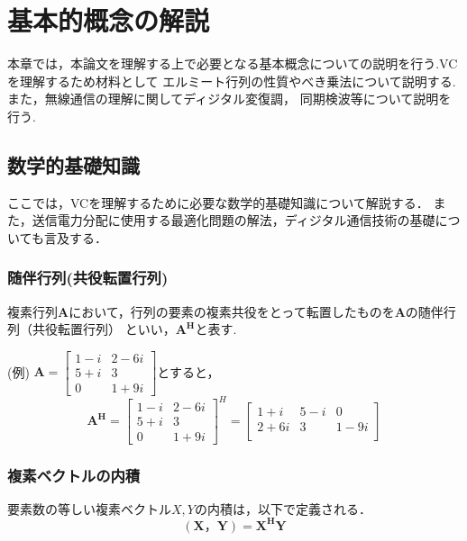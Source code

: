 \chapter{基本的概念の解説}
本章では，本論文を理解する上で必要となる基本概念についての説明を行う.VCを理解するため材料として
エルミート行列の性質やべき乗法について説明する. \cite{strang} また，無線通信の理解に関してディジタル変復調，
同期検波等について説明を行う.

\section{数学的基礎知識}
ここでは，VCを理解するために必要な数学的基礎知識について解説する．
また，送信電力分配に使用する最適化問題の解法，ディジタル通信技術の基礎についても言及する．

\subsection{随伴行列(共役転置行列)}
複素行列$\bm{A}$において，行列の要素の複素共役をとって転置したものを$\bm{A}$の随伴行列（共役転置行列）
といい，$\bm{A^H}$と表す.

(例)\quad
$
  \bm{A} = \left[
    \begin{array}{cc}
      1-i & 2-6i \\
      5+i & 3 \\
      0 & 1+9i
    \end{array}
  \right]
$とすると，
\vspace{1mm}
\begin{equation}
    \bm{A^H} = \left[
        \begin{array}{cc}
            1-i & 2-6i \\
            5+i & 3 \\
            0 & 1+9i
        \end{array}
    \right]^H 
    = \left[
        \begin{array}{ccc}
            1+i & 5-i & 0 \\
            2+6i & 3 & 1-9i \\
        \end{array}
    \right] \nonumber
\end{equation}

\subsection{複素ベクトルの内積}
要素数の等しい複素ベクトル$X,Y$の内積は，以下で定義される．
\begin{equation}
    (\bm{X}，\bm{Y}) = \bm{X^HY}
\end{equation}

